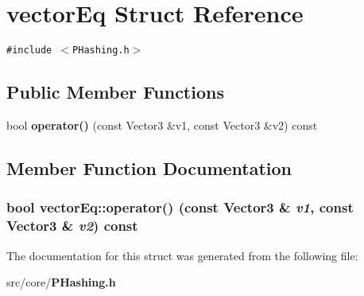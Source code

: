 \section{vector\-Eq Struct Reference}
\label{structvectorEq}
{\tt \#include $<$PHashing.h$>$}

\subsection*{Public Member Functions}
\begin{CompactItemize}
\item 
bool {\bf operator()} (const Vector3 \&v1, const Vector3 \&v2) const
\end{CompactItemize}


\subsection{Member Function Documentation}
\subsubsection{\setlength{\rightskip}{0pt plus 5cm}bool vector\-Eq::operator() (const Vector3 \& {\em v1}, const Vector3 \& {\em v2}) const\hspace{0.3cm}{\tt  [inline]}}\label{structvectorEq_82a0382eb61730658b4449fa95014f81}




The documentation for this struct was generated from the following file:\begin{CompactItemize}
\item 
src/core/{\bf PHashing.h}\end{CompactItemize}
